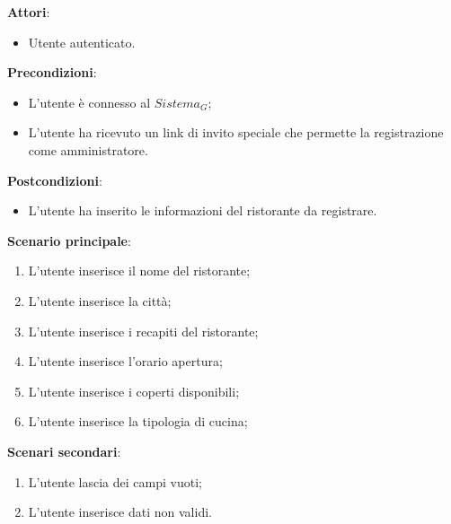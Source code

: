\textbf{Attori}:
\begin{itemize}
    \item Utente autenticato.
\end{itemize}
\textbf{Precondizioni}:
\begin{itemize}
    \item L'utente è connesso al $\textit{Sistema}_G$;
    \item L'utente ha ricevuto un link di invito speciale che permette la registrazione come amministratore.
\end{itemize}
\textbf{Postcondizioni}:
\begin{itemize}
    \item L'utente ha inserito le informazioni del ristorante da registrare.
\end{itemize}
\textbf{Scenario principale}:
\begin{enumerate}
    \item L'utente inserisce il nome del ristorante;
    \item L'utente inserisce la città;
    \item L'utente inserisce i recapiti del ristorante;
    \item L'utente inserisce l'orario apertura;
    \item L'utente inserisce i coperti disponibili;
    \item L'utente inserisce la tipologia di cucina;
\end{enumerate}
\textbf{Scenari secondari}:
    \begin{enumerate}
        \item L'utente lascia dei campi vuoti;
        \item L'utente inserisce dati non validi.
    \end{enumerate}

